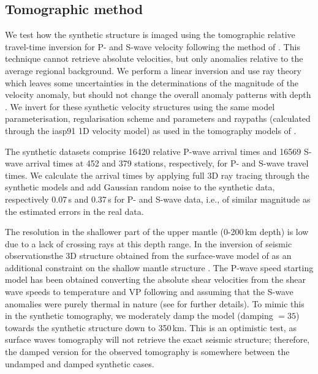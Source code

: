 \documentclass[a4paper,10pt,twocolumn]{paper}
\begin{document}
\subsection{Tomographic method}

We test how the synthetic structure is imaged using the tomographic relative travel-time inversion for P- and S-wave velocity following the method of \cite{vandecar-etal-1995}. This technique cannot retrieve absolute velocities, but only anomalies relative to the average regional background. We perform a linear inversion and use ray theory which leaves some uncertainties in the determinations of the magnitude of the velocity anomaly, but should not change the overall anomaly patterns with depth \citep{montelli-etal-2004b}. We invert for these synthetic velocity structures using the same model parameterisation, regularisation scheme and parameters and raypaths (calculated through the iasp91 1D velocity model) as used in the tomography models of \cite{civiero-etal-2016,civiero-etal-2015}.

The synthetic datasets comprise 16420 relative P-wave arrival times and 16569 S-wave arrival times at 452 and 379 stations, respectively, for P- and S-wave travel times. We calculate the arrival times by applying full 3D ray tracing \citep{julian-1977} through the synthetic models and add Gaussian random noise to the synthetic data, respectively 0.07\,s and 0.37\,s for P- and S-wave data, i.e., of similar magnitude as the estimated errors in the real data.

The resolution in the shallower part of the upper mantle (0-200\,km depth) is low due to a lack of crossing rays at this depth range. In the inversion of seismic observationsthe 3D structure obtained from the surface-wave model of \cite{fishwick-2010} as an additional constraint on the shallow mantle structure \citep{civiero-etal-2016,civiero-etal-2015}. The P-wave speed starting model has been obtained converting the absolute shear velocities from the shear wave speeds to temperature and VP following \cite{goes-2002} and assuming that the S-wave anomalies were purely thermal in nature (see \citealp{civiero-etal-2015} for further details). To mimic this in the synthetic tomography, we moderately damp the model (damping $= 35$) towards the synthetic structure down to 350\,km. This is an optimistic test, as surface waves tomography will not retrieve the exact seismic structure; therefore, the damped version for the observed tomography is somewhere between the undamped and damped synthetic cases.
\end{document}
